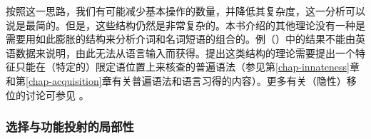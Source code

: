 按照这一思路，我们有可能减少基本操作的数量，并降低其复杂度，这一分析可以说是最简的。但是，这些结构仍然是非常复杂的。本书介绍的其他理论没有一种是需要用如此膨胀的结构来分析介词和名词短语的组合的。例（）中的结果不能由英语数据来说明，由此无法从语言输入而获得。提出这类结构的理论需要提出一个特征只能在（特定的）限定语位置上来核查的普遍语法（参见第\ref{chap-innateness}章和第\ref{chap-acquisition}章有关普遍语法和语言习得的内容）。更多有关（隐性）移位的讨论可参见 。

\subsubsection{选择与功能投射的局部性}

